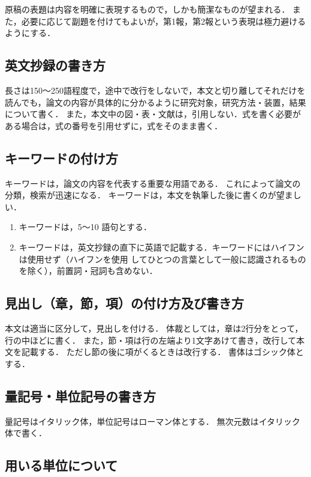 \documentclass[a4paper, 10pt, dvips, fleqn, uplatex]{jsarticle}
\begin{document}
原稿の表題は内容を明確に表現するもので，しかも簡潔なものが望まれる．
また，必要に応じて副題を付けてもよいが，第1報，第2報という表現は極力避けるようにする．


\subsection{英文抄録の書き方}

長さは150～250語程度で，途中で改行をしないで，本文と切り離してそれだけを読んでも，論文の内容が具体的に分かるように研究対象，研究方法・装置，結果について書く．
また，本文中の図・表・文献は，引用しない．式を書く必要がある場合は，式の番号を引用せずに，式をそのまま書く．


\subsection{キーワードの付け方}

キーワードは，論文の内容を代表する重要な用語である．
これによって論文の分類，検索が迅速になる．
キーワードは，本文を執筆した後に書くのが望ましい．
\begin{enumerate}[(1)]
  \item キーワードは，5～10 語句とする．
  \item キーワードは，英文抄録の直下に英語で記載する．キーワードにはハイフンは使用せず（ハイフンを使用
してひとつの言葉として一般に認識されるものを除く），前置詞・冠詞も含めない．
\end{enumerate}


\subsection{見出し（章，節，項）の付け方及び書き方}

本文は適当に区分して，見出しを付ける．
体裁としては，章は2行分をとって，行の中ほどに書く．
また，節・項は行の左端より1文字あけて書き，改行して本文を記載する．
ただし節の後に項がくるときは改行する．
書体はゴシック体とする．


\subsection{量記号・単位記号の書き方}

量記号はイタリック体，単位記号はローマン体とする．
無次元数はイタリック体で書く．


\subsection{用いる単位について}
\end{document}
